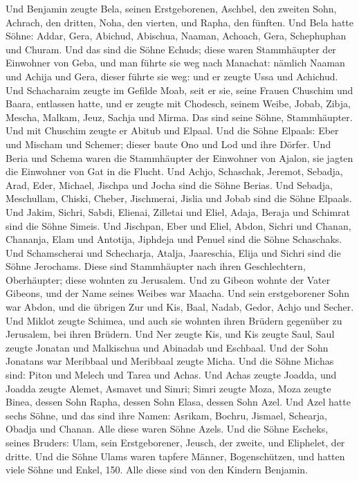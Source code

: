  Und Benjamin zeugte Bela, seinen Erstgeborenen, Aschbel,
den zweiten Sohn,  Achrach, den dritten, Noha, den
vierten, und Rapha, den fünften.  Und Bela hatte Söhne:
Addar, Gera, Abichud,  Abischua, Naaman, Achoach,
 Gera, Schephuphan und Churam.  Und das sind
die Söhne Echuds; diese waren Stammhäupter der Einwohner von Geba, und
man führte sie weg nach Manachat:  nämlich Naaman und
Achija und Gera, dieser führte sie weg: und er zeugte Ussa und Achichud.
 Und Schacharaim zeugte im Gefilde Moab, seit er sie,
seine Frauen Chuschim und Baara, entlassen hatte,  und er
zeugte mit Chodesch, seinem Weibe, Jobab, Zibja, Mescha, Malkam,
 Jeuz, Sachja und Mirma. Das sind seine Söhne,
Stammhäupter.  Und mit Chuschim zeugte er Abitub und
Elpaal.  Und die Söhne Elpaals: Eber und Mischam und
Schemer; dieser baute Ono und Lod und ihre Dörfer.  Und
Beria und Schema waren die Stammhäupter der Einwohner von Ajalon, sie
jagten die Einwohner von Gat in die Flucht.  Und Achjo,
Schaschak, Jeremot,  Sebadja, Arad, Eder, 
Michael, Jischpa und Jocha sind die Söhne Berias.  Und
Sebadja, Meschullam, Chiski, Cheber,  Jischmerai, Jislia
und Jobab sind die Söhne Elpaals.  Und Jakim, Sichri,
Sabdi,  Elienai, Zilletai und Eliel, 
Adaja, Beraja und Schimrat sind die Söhne Simeis.  Und
Jischpan, Eber und Eliel,  Abdon, Sichri und Chanan,
 Chananja, Elam und Antotija,  Jiphdeja
und Penuel sind die Söhne Schaschaks.  Und Schamscherai
und Schecharja, Atalja,  Jaareschia, Elija und Sichri
sind die Söhne Jerochams.  Diese sind Stammhäupter nach
ihren Geschlechtern, Oberhäupter; diese wohnten zu Jerusalem.
 Und zu Gibeon wohnte der Vater Gibeons, und der Name
seines Weibes war Maacha.  Und sein erstgeborener Sohn
war Abdon, und die übrigen Zur und Kis, Baal, Nadab, 
Gedor, Achjo und Secher.  Und Miklot zeugte Schimea, und
auch sie wohnten ihren Brüdern gegenüber zu Jerusalem, bei ihren
Brüdern.  Und Ner zeugte Kis, und Kis zeugte Saul, Saul
zeugte Jonatan und Malkischua und Abinadab und Eschbaal. 
Und der Sohn Jonatans war Meribbaal und Meribbaal zeugte Micha.
 Und die Söhne Michas sind: Piton und Melech und Tarea
und Achas.  Und Achas zeugte Joadda, und Joadda zeugte
Alemet, Asmavet und Simri; Simri zeugte Moza,  Moza
zeugte Binea, dessen Sohn Rapha, dessen Sohn Elasa, dessen Sohn Azel.
 Und Azel hatte sechs Söhne, und das sind ihre Namen:
Asrikam, Bochru, Jismael, Schearja, Obadja und Chanan. Alle diese waren
Söhne Azels.  Und die Söhne Escheks, seines Bruders:
Ulam, sein Erstgeborener, Jeusch, der zweite, und Eliphelet, der dritte.
 Und die Söhne Ulams waren tapfere Männer, Bogenschützen,
und hatten viele Söhne und Enkel, 150. Alle diese sind von den Kindern
Benjamin.

